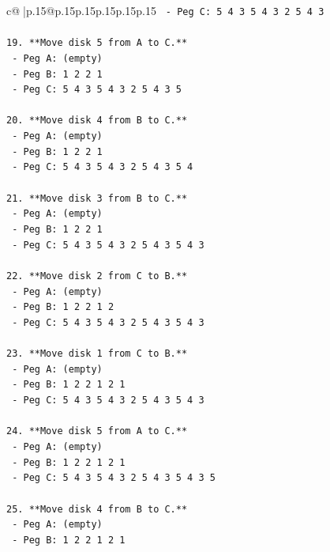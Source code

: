 \documentclass{article}
\begin{document}
{\begin{supertabular}{c@{$\;$}|p{.15\linewidth}@{}p{.15\linewidth}p{.15\linewidth}p{.15\linewidth}p{.15\linewidth}p{.15\linewidth}}
{{{\texttt{    {-} Peg C: 5 4 3 5 4 3 2 5 4 3} \\
\\ 
\texttt{19. **Move disk 5 from A to C.**} \\
\texttt{    {-} Peg A: (empty)} \\
\texttt{    {-} Peg B: 1 2 2 1} \\
\texttt{    {-} Peg C: 5 4 3 5 4 3 2 5 4 3 5} \\
\\ 
\texttt{20. **Move disk 4 from B to C.**} \\
\texttt{    {-} Peg A: (empty)} \\
\texttt{    {-} Peg B: 1 2 2 1} \\
\texttt{    {-} Peg C: 5 4 3 5 4 3 2 5 4 3 5 4} \\
\\ 
\texttt{21. **Move disk 3 from B to C.**} \\
\texttt{    {-} Peg A: (empty)} \\
\texttt{    {-} Peg B: 1 2 2 1} \\
\texttt{    {-} Peg C: 5 4 3 5 4 3 2 5 4 3 5 4 3} \\
\\ 
\texttt{22. **Move disk 2 from C to B.**} \\
\texttt{    {-} Peg A: (empty)} \\
\texttt{    {-} Peg B: 1 2 2 1 2} \\
\texttt{    {-} Peg C: 5 4 3 5 4 3 2 5 4 3 5 4 3} \\
\\ 
\texttt{23. **Move disk 1 from C to B.**} \\
\texttt{    {-} Peg A: (empty)} \\
\texttt{    {-} Peg B: 1 2 2 1 2 1} \\
\texttt{    {-} Peg C: 5 4 3 5 4 3 2 5 4 3 5 4 3} \\
\\ 
\texttt{24. **Move disk 5 from A to C.**} \\
\texttt{    {-} Peg A: (empty)} \\
\texttt{    {-} Peg B: 1 2 2 1 2 1} \\
\texttt{    {-} Peg C: 5 4 3 5 4 3 2 5 4 3 5 4 3 5} \\
\\ 
\texttt{25. **Move disk 4 from B to C.**} \\
\texttt{    {-} Peg A: (empty)} \\
\texttt{    {-} Peg B: 1 2 2 1 2 1} \\
}}}
\end{supertabular}}
\end{document}
